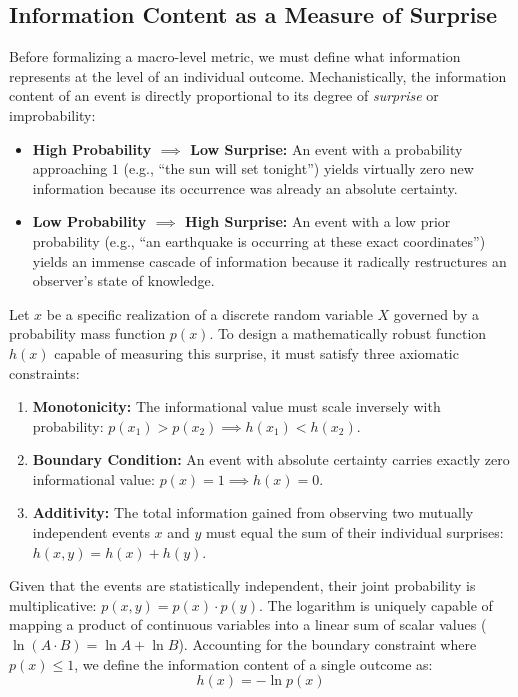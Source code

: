 \documentclass[11pt,a4paper]{article}
\begin{document}
\subsection{Information Content as a Measure of Surprise}
Before formalizing a macro-level metric, we must define what information represents at the level of an individual outcome. Mechanistically, the information content of an event is directly proportional to its degree of \textit{surprise} or improbability:
\begin{itemize}
    \item \textbf{High Probability $\implies$ Low Surprise:} An event with a probability approaching $1$ (e.g., ``the sun will set tonight'') yields virtually zero new information because its occurrence was already an absolute certainty.
    \item \textbf{Low Probability $\implies$ High Surprise:} An event with a low prior probability (e.g., ``an earthquake is occurring at these exact coordinates'') yields an immense cascade of information because it radically restructures an observer's state of knowledge.
\end{itemize}

Let $x$ be a specific realization of a discrete random variable $X$ governed by a probability mass function $p(x)$. To design a mathematically robust function $h(x)$ capable of measuring this surprise, it must satisfy three axiomatic constraints:
\begin{enumerate}
    \item \textbf{Monotonicity:} The informational value must scale inversely with probability: $p(x_1) > p(x_2) \implies h(x_1) < h(x_2)$.
    \item \textbf{Boundary Condition:} An event with absolute certainty carries exactly zero informational value: $p(x) = 1 \implies h(x) = 0$.
    \item \textbf{Additivity:} The total information gained from observing two mutually independent events $x$ and $y$ must equal the sum of their individual surprises: $h(x, y) = h(x) + h(y)$.
\end{enumerate}

Given that the events are statistically independent, their joint probability is multiplicative: $p(x, y) = p(x) \cdot p(y)$. The logarithm is uniquely capable of mapping a product of continuous variables into a linear sum of scalar values ($\ln(A \cdot B) = \ln A + \ln B$). Accounting for the boundary constraint where $p(x) \le 1$, we define the information content of a single outcome as:
\begin{equation}
h(x) = -\ln p(x)
\end{equation}
\end{document}
